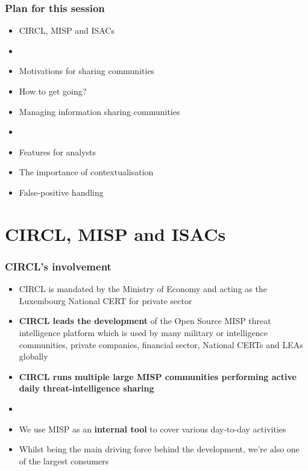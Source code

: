 
\begin{frame}[t,plain]
\titlepage
\end{frame}

\begin{frame}
	\frametitle{Plan for this session}
	\begin{itemize}
		\item CIRCL, MISP and ISACs
		\item []
		\item Motivations for sharing communities
		\item How to get going?
		\item Managing information sharing communities
		\item []
		\item Features for analysts
		\item The importance of contextualisation
		\item False-positive handling
	\end{itemize}
\end{frame}

\section{CIRCL, MISP and ISACs}

\begin{frame}
	\frametitle{CIRCL's involvement}
	\begin{itemize}
		\item CIRCL is mandated by the Ministry of Economy and acting as the Luxembourg National CERT for private sector
		\item \textbf{CIRCL leads the development} of the Open Source MISP threat intelligence platform which is used by many military or intelligence communities, private companies, financial sector, National CERTs and LEAs globally
		\item \textbf{CIRCL runs multiple large MISP communities performing active daily threat-intelligence sharing}
        \item []
        \item We use MISP as an \textbf{internal tool} to cover various day-to-day activities
        \item Whilst being the main driving force behind the development, we're also one of the largest consumers
	\end{itemize}
\end{frame}

